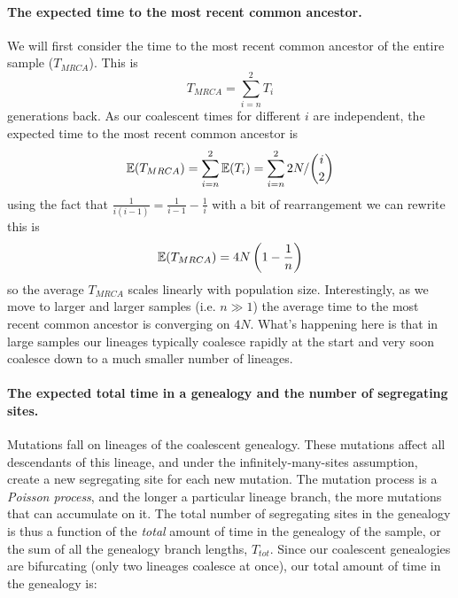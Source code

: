 \paragraph{The expected time to the most recent common ancestor.}
We will first consider the time to the most recent common ancestor of
the entire sample ($T_{MRCA}$). This is
\begin{equation}
T_{MRCA} = \sum_{i=n}^2 T_i
\end{equation}
generations back. As our coalescent times for different $i$ are independent, the expected time to the most recent common ancestor
is
\begin{equation}
\mathbb{E}(T_{MRCA}) = \sum_{i=n}^2 \mathbb{E}(T_i) = \sum_{i=n}^2  2N/{i \choose
 2}
\end{equation}
using the fact that $\frac{1}{i(i-1)}=\frac{1}{i-1} - \frac{1}{i}$ with a bit of
rearrangement we can rewrite this is
\begin{equation} 
\mathbb{E}(T_{MRCA}) = 4N\left(1- \frac{1}{n} \right) \label{TMRCA_neutral}
\end{equation}
so the average $T_{MRCA}$ scales linearly with population
size. Interestingly, as we move to larger and larger samples (i.e. $n \gg 1$) the average
time to the most recent common ancestor is converging on $4N$. What's
happening here is that in large samples our lineages typically coalesce rapidly
at the start and very soon coalesce down to a much smaller number of
lineages.   \\



\paragraph{The expected total time in a genealogy and the number of
  segregating sites.}

Mutations fall on lineages of the coalescent genealogy. These mutations affect all
descendants of this lineage, and under the infinitely-many-sites assumption,
create a new segregating site for each new mutation. The mutation process is a
\emph{Poisson process}, and the longer a particular lineage branch, the more
mutations that can accumulate on it. The total number of segregating sites in
the genealogy is thus a function of the \emph{total} amount of time in the
genealogy of the sample, or the sum of all the genealogy branch lengths,
$T_{tot}$. Since our coalescent genealogies are bifurcating (only two lineages
coalesce at once), our total amount of time in the genealogy is:

